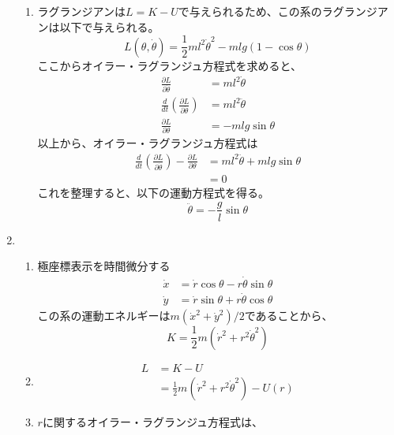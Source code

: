 \documentclass{jsarticle}
\begin{document}
\begin{enumerate}
\begin{enumerate}
          \item ラグランジアンは$L=K-U$で与えられるため、この系のラグランジアンは以下で与えられる。
                $$
                  L(\theta, \dot{\theta}) = \frac{1}{2}m l^2 \dot{\theta}^2 - mlg (1- \cos \theta)
                $$
                ここからオイラー・ラグランジュ方程式を求めると、
                $$
                  \begin{aligned}
                    \frac{\partial L}{\partial \dot{\theta}}                          & = ml^2 \dot{\theta}  \\
                    \frac{d}{dt}\left(\frac{\partial L}{\partial \dot{\theta}}\right) & = ml^2 \ddot{\theta} \\
                    \frac{\partial L}{\partial \theta}                                & = - mlg\sin \theta
                  \end{aligned}
                $$
                以上から、オイラー・ラグランジュ方程式は
                $$
                  \begin{aligned}
                    \frac{d}{dt}\left(\frac{\partial L}{\partial \dot{\theta}}\right)  - \frac{\partial L}{\partial \theta}
                     & = ml^2 \ddot{\theta} + mlg\sin \theta \\
                     & = 0
                  \end{aligned}
                $$
                これを整理すると、以下の運動方程式を得る。
                $$
                  \ddot{\theta} = -\frac{g}{l} \sin \theta
                $$
        \end{enumerate}
  \item
        \begin{enumerate}
          \item 極座標表示を時間微分する
                $$
                  \begin{aligned}
                    \dot{x} & = \dot{r}\cos \theta - r \dot{\theta} \sin \theta \\
                    \dot{y} & = \dot{r}\sin \theta + r \dot{\theta} \cos \theta
                  \end{aligned}
                $$
                この系の運動エネルギーは$m(\dot{x}^2 + \dot{y}^2)/2$であることから、
                $$
                  K = \frac{1}{2}m(\dot{r}^2 + r^2 \dot{\theta}^2)
                $$
          \item $$
                  \begin{aligned}
                    L & = K - U                                               \\
                      & = \frac{1}{2}m(\dot{r}^2 + r^2 \dot{\theta}^2) - U(r)
                  \end{aligned}
                $$
          \item $r$に関するオイラー・ラグランジュ方程式は、


\end{enumerate}
\end{enumerate}
\end{document}
